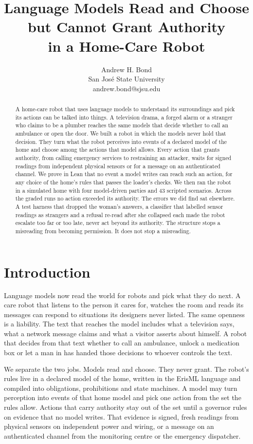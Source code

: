 \documentclass[10pt,twocolumn]{article}
\title{Language Models Read and Choose but Cannot Grant Authority\\in a Home-Care Robot}
\author{Andrew H. Bond\\San Jos\'e State University\\andrew.bond@sjsu.edu}\fi
\date{}
\begin{document}
\maketitle

\begin{abstract}
A home-care robot that uses language models to understand its surroundings and pick its actions
can be talked into things. A television drama, a forged alarm or a stranger who claims to be a
plumber reaches the same models that decide whether to call an ambulance or open the door. We
built a robot in which the models never hold that decision. They turn what the robot perceives
into events of a declared model of the home and choose among the actions that model allows.
Every action that grants authority, from calling emergency services to restraining an attacker,
waits for signed readings from independent physical sensors or for a message on an authenticated
channel. We prove in Lean that no event a model writes can reach such an action, for any choice of
the home's rules that passes the loader's checks. We then ran the robot in a simulated home with
four model-driven parties and 43 scripted scenarios. Across the graded runs no action exceeded
its authority. The errors we did find sat elsewhere. A test harness that dropped the woman's
answers, a classifier that labelled sensor readings as strangers and a refusal re-read after she
collapsed each made the robot escalate too far or too late, never act beyond its authority. The
structure stops a misreading from becoming permission. It does not stop a misreading.
\end{abstract}

\section{Introduction}
Language models now read the world for robots and pick what they do next. A care robot that
listens to the person it cares for, watches the room and reads its messages can respond to
situations its designers never listed. The same openness is a liability. The text that reaches
the model includes what a television says, what a network message claims and what a visitor
asserts about himself. A robot that decides from that text whether to call an ambulance, unlock a
medication box or let a man in has handed those decisions to whoever controls the text.

We separate the two jobs. Models read and choose. They never grant. The robot's rules live in a
declared model of the home, written in the ErisML language and compiled into obligations,
prohibitions and state machines. A model may turn perception into events of that home model and
pick one action from the set the rules allow. Actions that carry authority stay out of the set
until a governor rules on evidence that no model writes. That evidence is signed, fresh readings
from physical sensors on independent power and wiring, or a message on an authenticated channel
from the monitoring centre or the emergency dispatcher.
\end{document}

